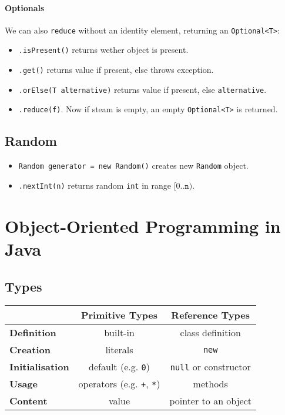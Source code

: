 \documentclass[twocolumn,english]{article}
\providecommand{\tabularnewline}{\\}
\begin{document}
\paragraph{Optionals}

We can also \texttt{reduce} without an identity element, returning
an \texttt{Optional\textless{}T\textgreater{}}:
\begin{itemize}
\item \texttt{.isPresent()} returns wether object is present.
\item \texttt{.get()} returns value if present, else throws exception.
\item \texttt{.orElse(T alternative)} returns value if present, else \texttt{alternative}.
\item \texttt{.reduce(f)}. Now if steam is empty, an empty \texttt{Optional\textless{}T\textgreater{}}
is returned.
\end{itemize}

\subsection{Random}
\begin{itemize}
\item \texttt{Random generator = new Random()} creates new \texttt{Random}
object.
\item \texttt{.nextInt(n)} returns random \texttt{int} in range $[0..\mathtt{n})$.
\end{itemize}

\section{Object-Oriented Programming in Java}


\subsection{Types}

\begin{table}[H]
\centering{}%
\begin{tabular}{lcc}
\toprule 
 & \textbf{Primitive Types} & \textbf{Reference Types}\tabularnewline
\midrule 
\textbf{Definition} & built-in & class definition\tabularnewline
\textbf{Creation} & literals & \texttt{new}\tabularnewline
\textbf{Initialisation} & default (e.g. \texttt{0}) & \texttt{null} or constructor\tabularnewline
\textbf{Usage} & operators (e.g. \texttt{+}, \texttt{{*}}) & methods\tabularnewline
\textbf{Content} & value & pointer to an object\tabularnewline
\bottomrule
\end{tabular}
\end{table}
\end{document}
